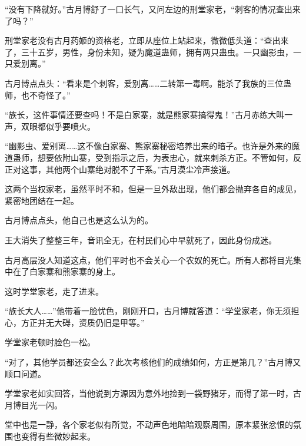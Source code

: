 \begin{this_body}
“没有下降就好。”古月博舒了一口长气，又问左边的刑堂家老，“刺客的情况查出来了吗？”

刑堂家老没有古月药姬的资格老，立即从座位上站起来，微微低头道：“查出来了，三十五岁，男性，身份未知，疑为魔道蛊师，拥有两只蛊虫。一只幽影虫，一只爱别离。”

古月博点点头：“看来是个刺客，爱别离……二转第一毒啊。能杀了我族的三位蛊师，也不奇怪了。”

“族长，这件事情还要查吗！不是白家寨，就是熊家寨搞得鬼！”古月赤练大叫一声，双眼都似乎要喷火。

“幽影虫、爱别离……这不像白家寨、熊家寨秘密培养出来的暗子。也许是外来的魔道蛊师，想要依附山寨，受到指示之后，为表忠心，就来刺杀方正。不管如何，反正对这事，其他两个山寨绝对脱不了干系。”古月漠尘冷声接道。

这两个当权家老，虽然平时不和，但是一旦外敌出现，他们都会抛弃各自的成见，紧密地团结在一起。

古月博点点头，他自己也是这么认为的。

王大消失了整整三年，音讯全无，在村民们心中早就死了，因此身份成迷。

古月高层没人知道这点，他们平时也不会关心一个农奴的死亡。所有人都将目光集中在了白家寨和熊家寨的身上。

这时学堂家老，走了进来。

“族长大人……”他带着一脸忧色，刚刚开口，古月博就答道：“学堂家老，你无须担心，方正并无大碍，资质仍旧是甲等。”

学堂家老顿时脸色一松。

“对了，其他学员都还安全么？此次考核他们的成绩如何，方正是第几？”古月博又顺口问道。

学堂家老如实回答，当他说到方源因为意外地捡到一袋野猪牙，而得了第一时，古月博目光一闪。

堂中也是一静，各个家老似有所觉，不动声色地暗暗观察周围，原本紧张忿恨的氛围也变得有些微妙起来。

\end{this_body}


